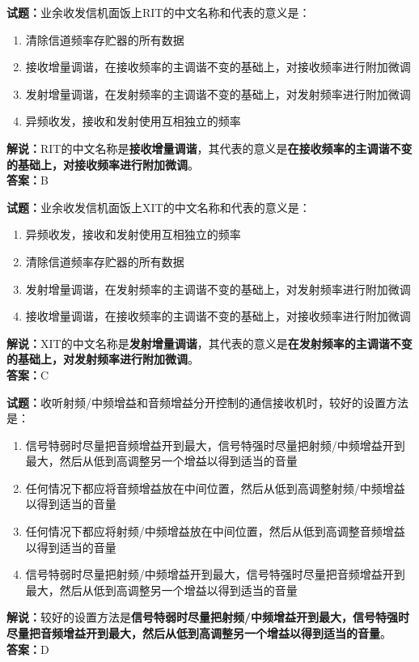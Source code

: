 \documentclass{ctexbook}
\begin{document}
\vspace{1em}

\textbf{试题：}业余收发信机面饭上RIT的中文名称和代表的意义是：
\begin{enumerate}[leftmargin=3em]
  \item 清除信道频率存贮器的所有数据
  \item 接收增量调谐，在接收频率的主调谐不变的基础上，对接收频率进行附加微调
  \item 发射增量调谐，在发射频率的主调谐不变的基础上，对发射频率进行附加微调
  \item 异频收发，接收和发射使用互相独立的频率
\end{enumerate}
\noindent\textbf{解说：}RIT的中文名称是\textbf{接收增量调谐}，其代表的意义是\textbf{在接收频率的主调谐不变的基础上，对接收频率进行附加微调}。\\\noindent\textbf{答案：}B

\vspace{1em}

\textbf{试题：}业余收发信机面饭上XIT的中文名称和代表的意义是：
\begin{enumerate}[leftmargin=3em]
  \item 异频收发，接收和发射使用互相独立的频率
  \item 清除信道频率存贮器的所有数据
  \item 发射增量调谐，在发射频率的主调谐不变的基础上，对发射频率进行附加微调
  \item 接收增量调谐，在接收频率的主调谐不变的基础上，对接收频率进行附加微调
\end{enumerate}
\noindent\textbf{解说：}XIT的中文名称是\textbf{发射增量调谐}，其代表的意义是\textbf{在发射频率的主调谐不变的基础上，对发射频率进行附加微调}。\\\noindent\textbf{答案：}C

\vspace{1em}

\textbf{试题：}收听射频/中频增益和音频增益分开控制的通信接收机时，较好的设置方法是：
\begin{enumerate}[leftmargin=3em]
  \item 信号特弱时尽量把音频增益开到最大，信号特强时尽量把射频/中频增益开到最大，然后从低到高调整另一个增益以得到适当的音量
  \item 任何情况下都应将音频增益放在中间位置，然后从低到高调整射频/中频增益以得到适当的音量
  \item 任何情况下都应将射频/中频增益放在中间位置，然后从低到高调整音频增益以得到适当的音量
  \item 信号特弱时尽量把射频/中频增益开到最大，信号特强时尽量把音频增益开到最大，然后从低到高调整另一个增益以得到适当的音量
\end{enumerate}
\noindent\textbf{解说：}较好的设置方法是\textbf{信号特弱时尽量把射频/中频增益开到最大，信号特强时尽量把音频增益开到最大，然后从低到高调整另一个增益以得到适当的音量}。\\\noindent\textbf{答案：}D
\end{document}
